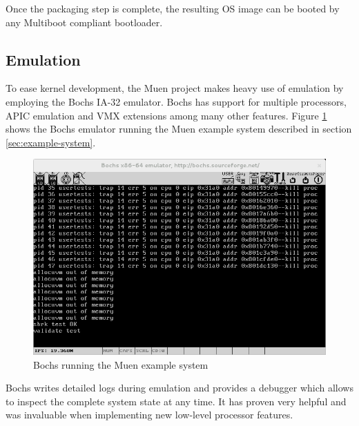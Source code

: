 Once the packaging step is complete, the resulting OS image can be booted by any
Multiboot \cite{multiboot} compliant bootloader.

\subsection{Emulation}\label{subsec:emulation}
To ease kernel development, the Muen project makes heavy use of emulation by
employing the Bochs IA-32 emulator. Bochs has support for multiple processors,
APIC emulation and VMX extensions among many other features. Figure
\ref{fig:bochs} shows the Bochs emulator running the Muen example system
described in section \ref{sec:example-system}.

\begin{figure}[h]
	\centering
	\includegraphics[width=\textwidth]{images/bochs}
	\caption{Bochs running the Muen example system}
	\label{fig:bochs}
\end{figure}

Bochs writes detailed logs during emulation and provides a debugger which allows
to inspect the complete system state at any time. It has proven very helpful
and was invaluable when implementing new low-level processor features.
